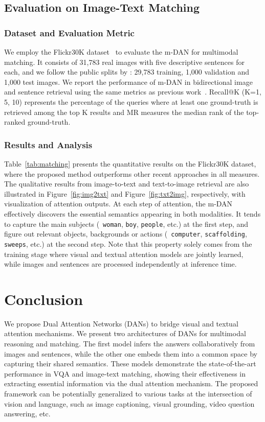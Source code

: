 \documentclass[10pt,twocolumn,letterpaper]{article}
\begin{document}
\subsection{Evaluation on Image-Text Matching}

\subsubsection{Dataset and Evaluation Metric}
We employ the Flickr30K dataset~\cite{young2014image} to evaluate the m-DAN for multimodal matching.
It consists of 31,783 real images with five descriptive sentences for each, and we follow the public splits by \cite{mao2015deep}: 29,783 training, 1,000 validation and 1,000 test images.
We report the performance of m-DAN in bidirectional image and sentence retrieval using the same metrics as previous work~\cite{yan2015deep,ma2015multimodal,mao2015deep,wang2016learning}.
Recall@K (K=1, 5, 10) represents the percentage of the queries where at least one ground-truth is retrieved among the top K results and MR measures the median rank of the top-ranked ground-truth.

\subsubsection{Results and Analysis}
Table~\ref{tab:matching} presents the quantitative results on the Flickr30K dataset, where the proposed method outperforms other recent approaches in all measures.
The qualitative results from image-to-text and text-to-image retrieval are also illustrated in Figure~\ref{fig:img2txt} and Figure~\ref{fig:txt2img}, respectively, with visualization of attention outputs.
At each step of attention, the m-DAN effectively discovers the essential semantics appearing in both modalities.
It tends to capture the main subjects (\eg~{\tt woman}, {\tt boy}, {\tt people}, etc.) at the first step, and figure out relevant objects, backgrounds or actions (\eg~{\tt computer}, {\tt scaffolding}, {\tt sweeps}, etc.) at the second step. 
Note that this property solely comes from the training stage where visual and textual attention models are jointly learned, while images and sentences are processed independently at inference time.

\section{Conclusion}
We propose Dual Attention Networks (DANs) to bridge visual and textual attention mechanisms.
We present two architectures of DANs for multimodal reasoning and matching.
The first model infers the answers collaboratively from images and sentences, while the other one embeds them into a common space by capturing their shared semantics.
These models demonstrate the state-of-the-art performance in VQA and image-text matching, showing their effectiveness in extracting essential information via the dual attention mechanism.
The proposed framework can be potentially generalized to various tasks at the intersection of vision and language, such as image captioning, visual grounding, video question answering, etc. 

{\small


}
\end{document}
